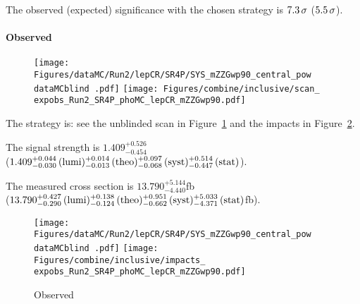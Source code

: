 \label{sec:unblinded_4L_inclusive}

The observed (expected) significance with the chosen strategy is
$7.3 \usep\sigma$
($5.5 \usep\sigma$).


\paragraph{Observed\\}
\begin{figure}
  \renewcommand{\dataMCblind}{}
  \renewcommand{\expobs}{observed}
  \centering
  \texttt{[image: Figures/dataMC/Run2/lepCR/SR4P/SYS\_mZZGwp90\_central\_pow\\dataMCblind .pdf]}
  \hfill
  \texttt{[image: Figures/combine/inclusive/scan\_\\expobs\_Run2\_SR4P\_phoMC\_lepCR\_mZZGwp90.pdf]}
  \caption{}
  \label{fig:scan_observed_inclusive_Run2_SR4P}
\end{figure}

The strategy is: see the unblinded scan in Figure~\ref{fig:scan_observed_inclusive_Run2_SR4P} and the impacts in Figure~\ref{fig:impacts_observed_inclusive_Run2_SR4P}.

The signal strength is $1.409{}^{+0.526}_{-0.454}$
\\
($1.409{}^{+0.044}_{-0.030}\,\text{(lumi)} {}^{+0.014}_{-0.013}\,\text{(theo)} {}^{+0.097}_{-0.068}\,\text{(syst)} {}^{+0.514}_{-0.447}\,\text{(stat)}$).

The measured cross section is
$13.790{}^{+5.144}_{-4.440}$\usep fb
\\
($13.790{}^{+0.427}_{-0.290}\,\text{(lumi)} {}^{+0.138}_{-0.124}\,\text{(theo)} {}^{+0.951}_{-0.662}\,\text{(syst)} {}^{+5.033}_{-4.371}\,\text{(stat)}$\usep fb).

\begin{figure}
  \renewcommand{\dataMCblind}{}
  \renewcommand{\expobs}{observed}
  \centering
  \texttt{[image: Figures/dataMC/Run2/lepCR/SR4P/SYS\_mZZGwp90\_central\_pow\\dataMCblind .pdf]}
  \hfill
  \texttt{[image: Figures/combine/inclusive/impacts\_\\expobs\_Run2\_SR4P\_phoMC\_lepCR\_mZZGwp90.pdf]}
  \caption{Observed }
  \label{fig:impacts_observed_inclusive_Run2_SR4P}
\end{figure}

